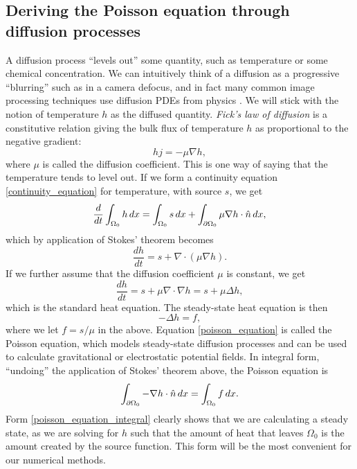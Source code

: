 \subsection{Deriving the Poisson equation through diffusion processes}
A diffusion process ``levels out'' some quantity, such as temperature or some chemical concentration. We can intuitively think of a diffusion as a
progressive ``blurring''
such as in a camera defocus, and in fact many common image processing techniques use diffusion PDEs from physics \cite{tum}. We will stick with
the notion of temperature $h$ as the diffused quantity.
\textit{Fick's law of diffusion} is a constitutive relation giving the bulk flux of temperature $h$ as proportional to the negative gradient:
    $$hj = -\mu\nabla h,$$
where $\mu$ is called the diffusion coefficient.
This is one way of saying that the temperature tends to level out.
If we form a continuity equation \eqref{continuity_equation} for temperature, with source $s$, we get
\begin{equation}\label{heat_equation_integral}
    \frac{d}{dt} \int_{\Omega_0} h\,dx = \int_{\Omega_0} s\,dx + \int_{{\partial\Omega_0}} \mu \nabla h \cdot \hat{n}\,dx,
\end{equation}
which by application of Stokes' theorem becomes
\begin{equation}\label{heat_equation_differential}
    \frac{dh}{dt} = s + \nabla \cdot \left(\mu \nabla h\right).
\end{equation}
If we further assume that the diffusion coefficient $\mu$ is constant, we get
\begin{equation}\label{heat_equation_differential_constant}
    \frac{dh}{dt} = s + \mu\nabla \cdot \nabla h = s + \mu\Delta h,
\end{equation}
which is the standard heat equation.
The steady-state heat equation is then
\begin{equation}\label{poisson_equation}
    -\Delta h = f,
\end{equation}
where we let $f = s/\mu$ in the above. Equation \eqref{poisson_equation} is called the Poisson equation,
which models steady-state diffusion processes and can be used to calculate gravitational or electrostatic potential fields.
In integral form, ``undoing'' the application of Stokes' theorem above, the Poisson equation is
\begin{equation}\label{poisson_equation_integral}
    \int_{{\partial\Omega_0}} -\nabla h\cdot \hat{n}\,dx = \int_{{\Omega_0}} f\,dx.
\end{equation}
Form \eqref{poisson_equation_integral} clearly shows that we are calculating a steady state,
as we are solving for $h$ such that the amount of heat that leaves $\Omega_0$ is the amount created by the source function.
This form will be the most convenient for our numerical methods.
